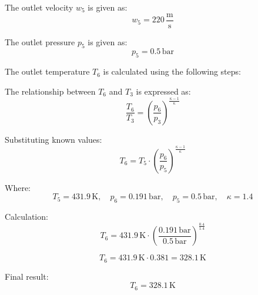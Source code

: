 The outlet velocity \( w_5 \) is given as:  
\[
w_5 = 220 \, \frac{\text{m}}{\text{s}}
\]

The outlet pressure \( p_5 \) is given as:  
\[
p_5 = 0.5 \, \text{bar}
\]

The outlet temperature \( T_6 \) is calculated using the following steps:  

The relationship between \( T_6 \) and \( T_3 \) is expressed as:  
\[
\frac{T_6}{T_3} = \left( \frac{p_6}{p_3} \right)^{\frac{\kappa - 1}{\kappa}}
\]

Substituting known values:  
\[
T_6 = T_5 \cdot \left( \frac{p_6}{p_5} \right)^{\frac{\kappa - 1}{\kappa}}
\]

Where:  
\[
T_5 = 431.9 \, \text{K}, \quad p_6 = 0.191 \, \text{bar}, \quad p_5 = 0.5 \, \text{bar}, \quad \kappa = 1.4
\]

Calculation:  
\[
T_6 = 431.9 \, \text{K} \cdot \left( \frac{0.191 \, \text{bar}}{0.5 \, \text{bar}} \right)^{\frac{0.4}{1.4}}
\]

\[
T_6 = 431.9 \, \text{K} \cdot 0.381 = 328.1 \, \text{K}
\]

Final result:  
\[
T_6 = 328.1 \, \text{K}
\]